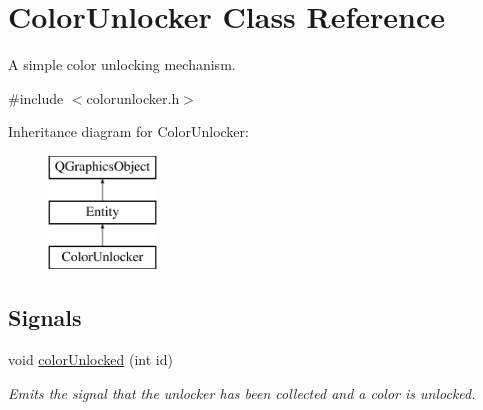 \hypertarget{class_color_unlocker}{}\section{Color\+Unlocker Class Reference}
\label{class_color_unlocker}


A simple color unlocking mechanism.  




{\ttfamily \#include $<$colorunlocker.\+h$>$}

Inheritance diagram for Color\+Unlocker\+:\begin{figure}[H]
\begin{center}
\leavevmode
\includegraphics[height=3.000000cm]{class_color_unlocker}
\end{center}
\end{figure}
\subsection*{Signals}
\begin{DoxyCompactItemize}
\item 
void \hyperlink{class_color_unlocker_a7f62aef5c3fba7f0fc57aecb3d3288a0}{color\+Unlocked} (int id)
\begin{DoxyCompactList}\small\item\em Emits the signal that the unlocker has been collected and a color is unlocked. \end{DoxyCompactList}\end{DoxyCompactItemize}
